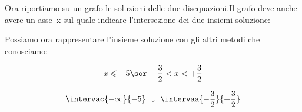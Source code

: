 \begin{esempio}{}{}
Ora riportiamo su un grafo le soluzioni delle due disequazioni.Il grafo deve 
anche avere un asse~x sul quale indicare l'intersezione dei due insiemi 
soluzione:
\begin{center} \grrsistemaa \end{center}
% 
% 
% 
% 
% 

Possiamo ora rappresentare l'insieme soluzione con gli altri metodi che 
conosciamo:

\begin{minipage}{.49 \linewidth}
\[x \leqslant -5 \sor -\dfrac{3}{2} < x < +\dfrac{3}{2}\]
\end{minipage}
\hfill
\begin{minipage}{.49 \linewidth}
\[\intervac{-\infty}{-5}~\cup~\intervaa{-\dfrac{3}{2}}{+\dfrac{3}{2}}\]
\end{minipage}
\end{esempio}


